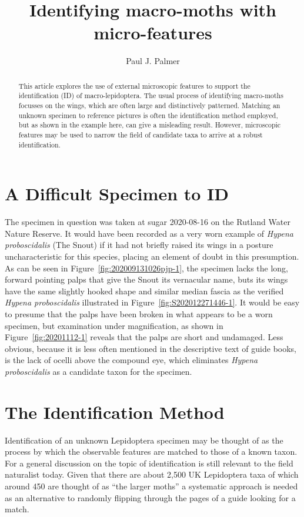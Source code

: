\documentclass[]{article}
\title{Identifying macro-moths with micro-features}
\author{Paul J. Palmer}
\begin{document}
\maketitle

\begin{abstract}

This article explores the use of external microscopic features to support the identification (ID) of  macro-lepidoptera. The usual process of identifying macro-moths  focusses on the wings, which are often large and distinctively patterned. Matching an unknown specimen to reference pictures is often the identification method employed, but as shown in the example here, can give a misleading result.
 However, microscopic features may be used to narrow the field of candidate taxa to arrive at a robust identification. 

\end{abstract}

\section*{A Difficult Specimen to ID}
The specimen in question was taken at sugar 2020-08-16 on the Rutland Water Nature Reserve. It would have been recorded as a very worn example of \textit{Hypena proboscidalis} (The Snout) if it had not briefly raised its wings in a posture uncharacteristic for this species, placing an element of doubt in this presumption. As can be seen in Figure~\ref{fig:202009131026pjp-1}, the specimen lacks the long, forward pointing palps that give the Snout its vernacular name, buts its wings have the same slightly hooked shape  and similar median fascia as the verified \textit{Hypena proboscidalis} illustrated in  Figure~\ref{fig:S202012271446-1}.  It would be easy to presume that the palps have been broken in what appears to be a worn specimen, but examination under magnification, as shown in  Figure~\ref{fig:20201112-1} reveals that the palps are short and undamaged. Less obvious, because it is less often mentioned in the descriptive text of guide books, is the lack of ocelli above the compound eye,  which  eliminates \textit{Hypena proboscidalis} as a candidate taxon for the specimen.

\section*{The Identification Method}
Identification of an unknown Lepidoptera specimen may be thought of as the process by which the  observable features are matched to those of a known taxon.
For a general discussion on the topic of identification \citet{Pankhurst1978} is still relevant to the field naturalist today.
 Given that there are about 2,500 UK Lepidoptera taxa of which around 450 are thought of as \enquote{the larger moths} a systematic approach is needed as an alternative to randomly flipping through the pages of a guide looking for a match.
 
\end{document}
